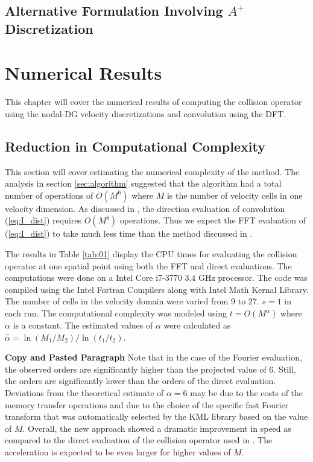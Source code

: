 \documentclass[12pt]{CSUNthesis}
\begin{document}
\section{Alternative Formulation Involving $A^+$ Discretization}

\chapter{Numerical Results}

This chapter will cover the numerical results of computing the collision operator using the nodal-DG velocity discretizations and convolution using the DFT. 

\section{Reduction in Computational Complexity}

This section will cover estimating the numerical complexity of the method. 
The analysis in section \ref{sec:algorithm} suggested that the algorithm had a total number of operations of $O(M^6)$ where $M$ is the number of velocity cells in one velocity dimension. 
As discussed in \cite{AlekseenkoJosyula2012a}, the direction evaluation of convolution (\ref{eq:I_dist}) requires $O(M^8)$ operations. Thus we expect the FFT evaluation of (\ref{eq:I_dist}) to take much less time than the method discussed in \cite{AlekseenkoJosyula2012a}.

The results in Table \ref{tab:01} display the CPU times for evaluating the collision operator at one spatial point using both the FFT and direct evaluations. 
The computations were done on a Intel Core i7-3770 3.4 GHz processor. 
The code was compiled using the Intel Fortran Compilers along with Intel Math Kernal Library.
The number of cells in the velocity domain were varied from 9 to 27. $s=1$ in each run. 
The computational complexity was modeled using $t=O(M^\alpha)$ where $\alpha$ is a constant. 
The estimated values of $\alpha$ were calculated as $\hat{\alpha}=\ln(M_{1}/M_{2})/\ln(t_{1}/t_{2})$. 

\textbf{Copy and Pasted Paragraph} Note that in the case of the Fourier evaluation, the observed orders are significantly 
higher than the projected value of 6. Still, the orders are significantly lower than the 
orders of the direct evaluation. Deviations from the theoretical estimate of 
$\alpha=6$ may be due to the costs of the memory transfer operations and due to the choice of 
the specific fast Fourier transform that was automatically selected by the KML library based 
on the value of $M$. Overall, the new approach showed a dramatic improvement in speed as 
compared to the direct evaluation of the collision operator used in \cite{AlekseenkoJosyula2012}.
The acceleration is expected to be even larger for higher values of $M$.
\end{document}
